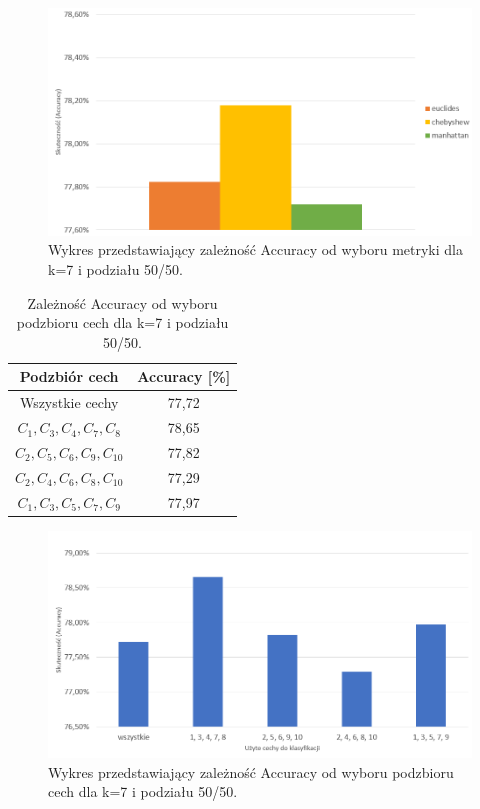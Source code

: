 \documentclass{classrep}
\begin{document}
\begin{figure}[h!]
    \centering
    \includegraphics[width=1\textwidth]{metryki.png}
    \caption{Wykres przedstawiający zależność Accuracy od wyboru metryki dla k=7 i podziału 50/50.}
    \label{metryki}
\end{figure}
\begin{table}[h!]
	\centering
	\begin{tabular} {c c}
		\hline
		\textbf{Podzbiór cech} & \textbf{Accuracy [\%]} \\ [0.5ex] 
		\hline
		\hline 
		Wszystkie cechy & 77,72 \\ 
		$C_1, C_3, C_4, C_7, C_8$ & 78,65 \\
		$C_2, C_5, C_6, C_9, C_10$ & 77,82 \\
		$C_2, C_4, C_6, C_8, C_10$ & 77,29 \\
		$C_1, C_3, C_5, C_7, C_9$ & 77,97 \\
		\hline
	\end{tabular}
	\caption{Zależność Accuracy od wyboru podzbioru cech dla k=7 i podziału 50/50. }
\end{table}

\begin{figure}[h!]
    \centering
    \includegraphics[width=1\textwidth]{cechy7manh5050.png}
    \caption{Wykres przedstawiający zależność Accuracy od wyboru podzbioru cech dla k=7 i podziału 50/50.}
    \label{cechy}
\end{figure}
\end{document}
